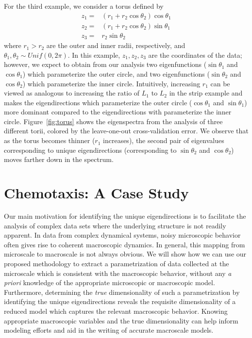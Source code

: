 For the third example, we consider a torus defined by
%
\begin{equation}
\begin{aligned}
z_1 =& (r_1 + r_2 \cos \theta_2 ) \cos \theta_1 \\
z_2 =& (r_1 + r_2 \cos \theta_2 ) \sin \theta_1 \\
z_3 =& r_2 \sin \theta_2
\end{aligned}
\label{eq:torus}
\end{equation}
%
where $r_1 > r_2$ are the outer and inner radii, respectively, and $\theta_1, \theta_2 \sim Unif(0, 2 \pi)$.
%
In this example, $z_1, z_2, z_3$ are the coordinates of the data; however, we expect to obtain from our analysis two eigenfunctions ($\sin \theta_1$ and $\cos \theta_1$) which parameterize the outer circle, and two eigenfunctions ($\sin \theta_2$ and $\cos \theta_2$) which parameterize the inner circle.
%
Intuitively, increasing $r_1$ can be viewed as analogous to increasing the ratio of $L_1$ to $L_2$ in the strip example and makes the eigendirections which parameterize the outer circle ($\cos \theta_1$ and $\sin \theta_1$) more dominant compared to the eigendirections with parameterize the inner circle.
%
Figure~\ref{fig:torus} shows the eigenspectra from the analysis of three different torii, colored by the leave-one-out cross-validation error.
%
We observe that as the torus becomes thinner ($r_1$ increases), the second pair of eigenvalues corresponding to unique eigendirections (corresponding to $\sin \theta_2$ and $\cos \theta_2$) moves farther down in the spectrum.

\section{Chemotaxis: A Case Study}

Our main motivation for identifying the unique eigendirections is to facilitate the analysis of complex data sets where the underlying structure is not readily apparent.
%
In data from complex dynamical systems, noisy microscopic behavior often gives rise to coherent macroscopic dynamics.
%
In general, this mapping from microscale to macroscale is not always obvious.
%
We will show how we can use our proposed methodology to extract a parametrization of data collected at the microscale which is consistent with the macroscopic behavior, without any {\em a priori} knowledge of the appropriate microscopic or macroscopic model.
%
Furthermore, determining the {\em true} dimensionality of such a parametrization by identifying the unique eigendirections reveals the requisite dimensionality of a reduced model which captures the relevant macroscopic behavior.
%
Knowing appropriate macroscopic variables and the true dimensionality can help inform modeling efforts and aid in the writing of accurate macroscale models.


